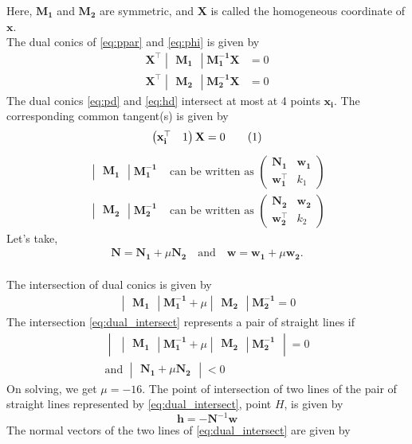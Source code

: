 \documentclass[journal,12pt,twocolumn]{IEEEtran}
\let\vec\mathbf
\newcommand{\myvec}[1]{\ensuremath{\begin{pmatrix}#1\end{pmatrix}}}
\newcommand{\mydet}[1]{\ensuremath{\begin{vmatrix}#1\end{vmatrix}}}
\providecommand{\brak}[1]{\ensuremath{\left(#1\right)}}
\newcommand\numberthis{\addtocounter{equation}{1}\tag{\theequation}}
\begin{document}
Here, $\vec{M_1}$ and $\vec{M_2}$ are symmetric, and $\vec{X}$ is called the homogeneous coordinate of $\vec{x}$. \\
The dual conics of \eqref{eq:ppar} and \eqref{eq:phi} is given by
\begin{align}
		\vec{X^{\top}}\mydet{\vec{M_1}}\vec{M_1^{-1}}\vec{X} &= 0 \label{eq:pd} \\
		\vec{X^{\top}}\mydet{\vec{M_2}}\vec{M_2^{-1}}\vec{X} &= 0 \label{eq:hd} 
\end{align}
The dual conics \eqref{eq:pd} and \eqref{eq:hd} intersect at most at 4 points $\vec{x_i}$. The corresponding common tangent(s) is given by \[ \myvec{\vec{x_i^{\top}}&1}\vec{X}=0 \label{eq:tangent_eqn} \numberthis \]
\begin{align*}
		\mydet{\vec{M_1}}\vec{M_1^{-1}} &\text{ can be written as } \myvec{\vec{N_1}&\vec{w_1}\\\vec{w_1^{\top}}&k_1} \\[0.5ex]
		\mydet{\vec{M_2}}\vec{M_2^{-1}} &\text{ can be written as } \myvec{\vec{N_2}&\vec{w_2}\\\vec{w_2^{\top}}&k_2}
\end{align*}
Let's take, 
\begin{align*}
		\vec{N} = \vec{N_1}+\mu\vec{N_2} \quad \text{and} \quad
		\vec{w} = \vec{w_1}+\mu\vec{w_2} \text{.}
\end{align*}
\\
The intersection of dual conics is given by
\begin{align}
\mydet{\vec{M_1}}\vec{M_1^{-1}}+\mu\mydet{\vec{M_2}}\vec{M_2^{-1}} = 0 \label{eq:dual_intersect}
\end{align}
The intersection \eqref{eq:dual_intersect} represents a pair of straight lines if 
\begin{gather*}
		\mydet{\mydet{\vec{M_1}}\vec{M_1^{-1}}+\mu\mydet{\vec{M_2}}\vec{M_2^{-1}}} = 0 \\
	\text{and }	\mydet{\vec{N_1}+\mu\vec{N_2}} < 0	
\end{gather*}
On solving, we get $\mu=-16$. %
The point of intersection of two lines of the pair of straight lines represented by \eqref{eq:dual_intersect}, point $H$, is given by %
\begin{equation}
		\vec{h} = -\vec{N}^{-1}\vec{w} %
\end{equation}
The normal vectors of the two lines of \eqref{eq:dual_intersect} are given by
\end{document}

